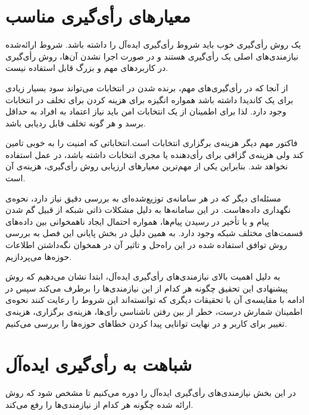 \section{معیار‌های رأی‌گیری مناسب}
یک روش رأی‌گیری خوب باید  شروط رأی‌گیری ایده‌آل را داشته باشد. شروط ارائه‌شده نیازمندی‌های اصلی یک رأی‌گیری هستند و در صورت اجرا نشدن آن‌ها، روش رأی‌گیری در کاربرد‌های مهم و بزرگ قابل استفاده نیست. 
\par 
از آنجا که در رأی‌گیری‌های مهم، برنده شدن در انتخابات می‌تواند سود بسیار زیادی برای یک کاندیدا داشته باشد همواره انگیزه برای هزینه کردن برای تخلف در انتخابات وجود دارد. لذا برای اطمینان از یک انتخابات امن باید نیاز اعتماد به افراد به حداقل برسد و هر گونه تخلف قابل ردیابی باشد. 
\par 
فاکتور مهم دیگر هزینه‌ی برگزاری انتخابات است.انتخاباتی که امنیت را به خوبی تامین کند ولی هزینه‌ی گزافی برای رأی‌دهنده یا مجری انتخابات داشته باشد، در عمل استفاده نخواهد شد. بنابراین یکی از مهم‌ترین معیارهای ارزیابی روش رأی‌گیری، هزینه‌ی آن است. 
\par 
مسئله‌ای دیگر که در هر سامانه‌ی توزیع‌شده‌ای به بررسی دقیق نیاز دارد، نحوه‌ی نگهداری داده‌هاست. در این سامانه‌ها به دلیل مشکلات ذاتی شبکه از قبیل گم شدن پیام و یا تأخیر در رسیدن پیام‌ها، همواره احتمال ایجاد ناهمخوانی بین داده‌های قسمت‌های مختلف شبکه وجود دارد. به همین دلیل در بخش پایانی این فصل به بررسی روش توافق استفاده شده در این راه‌حل و تاثیر آن در همخوان نگه‌داشتن اطلاعات حوزه‌ها می‌پردازیم. 
\par
به دلیل اهمیت بالای نیازمندی‌های رأی‌گیری ایده‌آل، ابتدا نشان می‌دهیم که روش پیشنهادی این تحقیق چگونه هر کدام از این نیازمندی‌ها را برطرف می‌کند سپس در ادامه با مقایسه‌ی آن با تحقیقات دیگری که توانسته‌اند این شروط را رعایت کنند نحوه‌ی اطمینان شمارش درست، خطر از بین رفتن ناشناسی رأی‌ها، هزینه‌ی برگزاری، هزینه‌ی تغییر برای کاربر و در نهایت توانایی پیدا کردن خطاهای حوزه‌ها را بررسی می‌کنیم.
\section{شباهت به رأی‌گیری ایده‌آل}
در این بخش نیازمندی‌های رأی‌گیری ایده‌آل را دوره می‌کنیم تا مشخص شود که روش ارائه شده چگونه هر کدام از نیاز‌مندی‌ها را رفع می‌کند.


